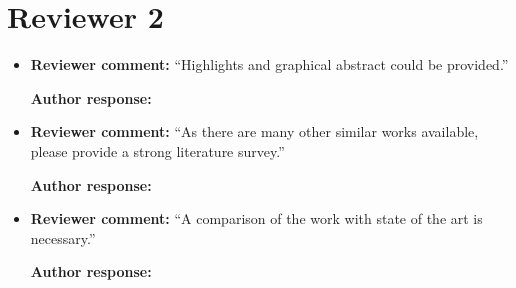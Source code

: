 \documentclass{article} %
\begin{document}
\section{Reviewer 2}
\begin{itemize}
    \item{
    {\bf Reviewer comment:} ``Highlights and graphical abstract could be provided.''
    
    {\bf Author response:}
    }
    \item{
    {\bf Reviewer comment:} ``As there are many other similar works available, please provide a strong literature survey.''
    
    {\bf Author response:}
    }
    \item{
    {\bf Reviewer comment:} ``A comparison of the work with state of the art is necessary.''
    
    {\bf Author response:}
    }
\end{itemize}
\end{document}

